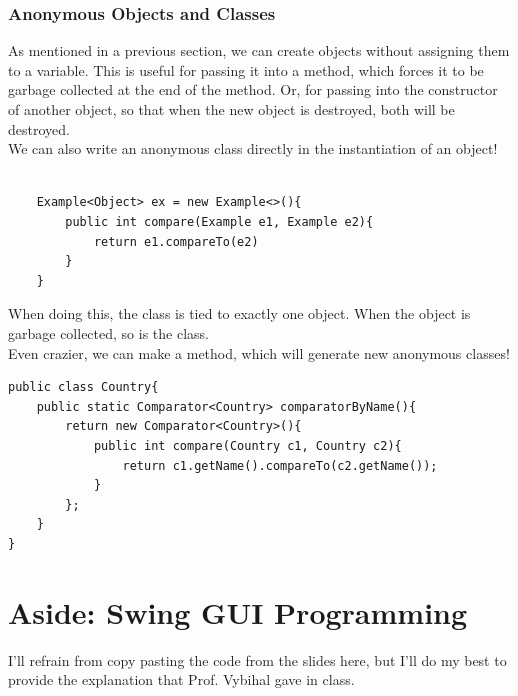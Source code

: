 \documentclass[12pt]{article}
\theoremstyle{definition}
\begin{document}
\section{Anonymous Objects and Classes}
As mentioned in a previous section, we can create objects without assigning them to a variable. This is useful for passing it into a method, which forces it to be garbage collected at the end of the method. Or, for passing into the constructor of another object, so that when the new object is destroyed, both will be destroyed.
\\ \linebreak
We can also write an anonymous class directly in the instantiation of an object!
\begin{lstlisting}
	
	Example<Object> ex = new Example<>(){
		public int compare(Example e1, Example e2){
			return e1.compareTo(e2)
		}
	}
\end{lstlisting}
When doing this, the class is tied to exactly one object. When the object is garbage collected, so is the class.
\\ \linebreak
Even crazier, we can make a method, which will generate new anonymous classes!
\begin{lstlisting}
public class Country{
	public static Comparator<Country> comparatorByName(){
		return new Comparator<Country>(){
			public int compare(Country c1, Country c2){
				return c1.getName().compareTo(c2.getName());
			}
		};
	}
}
\end{lstlisting}

\part{Aside: Swing GUI Programming}
I'll refrain from copy pasting the code from the slides here, but I'll do my best to provide the explanation that Prof. Vybihal gave in class.
\\ \linebreak
\end{document}
